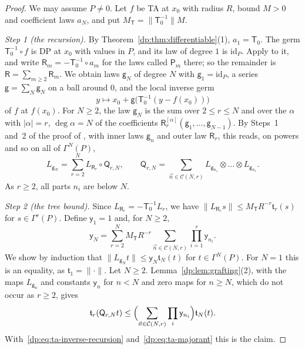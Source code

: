 \documentclass[11pt]{amsart}
\theoremstyle{definition}
\theoremstyle{remark}
\numberwithin{equation}{section}
\newcommand{\id}{\mathrm{id}}
\newcommand{\abs}[1]{\lvert #1\rvert}
\newcommand{\norm}[1]{\lVert #1\rVert}
\theoremstyle{plain}
\theoremstyle{definition}
\theoremstyle{plain}
\begin{document}
\begin{proof}
We may assume $P\ne0$. Let $f$ be TA at $x_0$ with radius $R$, bound $M>0$ and coefficient laws $a_N$, and put $M_{\mathsf T}=\norm{\mathsf T_0^{-1}}M$.

\emph{Step 1 (the recursion).} By Theorem~\ref{dp:thm:differentiable}(1), $a_1=\mathsf T_0$. The germ $\mathsf T_0^{-1}\circ f$ is DP at $x_0$ with values in $P$, and its law of degree $1$ is $\id_P$. Apply \cite[Lemma~Q.14]{I} to it, and write $\mathsf R_m=-\mathsf T_0^{-1}\circ a_m$ for the laws called $\mathsf P_m$ there; so the remainder is $\mathsf R=\sum_{m\ge2}\mathsf R_m$. We obtain laws $\mathsf g_N$ of degree $N$ with $\mathsf g_1=\id_P$, a series $\mathsf g=\sum_N\mathsf g_N$ on a ball around $0$, and the local inverse germ
\begin{equation}\label{dp:eq:ta-inverse-germ}
 y\longmapsto x_0+\mathsf g\bigl(\mathsf T_0^{-1}(y-f(x_0))\bigr)
\end{equation}
of $f$ at $f(x_0)$. For $N\ge2$, the law $\mathsf g_N$ is the sum over $2\le r\le N$ and over the $\alpha$ with $\abs\alpha=r$, $\deg\alpha=N$ of the coefficients $\mathsf R_r^{[\alpha]}(\mathsf g_1,\dots,\mathsf g_{N-1})$. By Steps~1 and~2 of the proof of \cite[Lemma~Q.4]{I}, with inner laws $\mathsf g_n$ and outer law $\mathsf R_r$, this reads, on powers and so on all of $\Gamma^N(P)$,
\begin{equation}\label{dp:eq:ta-inverse-recursion}
 L_{\mathsf g_N}=\sum_{r=2}^NL_{\mathsf R_r}\circ\mathsf Q_{r,N},\qquad
 \mathsf Q_{r,N}=\sum_{\vec n\in\mathcal C(N,r)}L_{\mathsf g_{n_1}}\otimes\dots\otimes L_{\mathsf g_{n_r}}.
\end{equation}
As $r\ge2$, all parts $n_i$ are below $N$.

\emph{Step 2 (the tree bound).} Since $L_{\mathsf R_r}=-\mathsf T_0^{-1}L_r$, we have $\norm{L_{\mathsf R_r}s}\le M_{\mathsf T}R^{-r}\mathfrak t_r(s)$ for $s\in\Gamma^r(P)$. Define $\mathsf y_1=1$ and, for $N\ge2$,
\begin{equation}\label{dp:eq:ta-majorant}
 \mathsf y_N=\sum_{r=2}^NM_{\mathsf T}R^{-r}\sum_{\vec n\in\mathcal C(N,r)}\prod_{i=1}^r\mathsf y_{n_i}.
\end{equation}
We show by induction that $\norm{L_{\mathsf g_N}t}\le\mathsf y_N\mathfrak t_N(t)$ for $t\in\Gamma^N(P)$. For $N=1$ this is an equality, as $\mathfrak t_1=\norm\cdot$. Let $N\ge2$. Lemma~\ref{dp:lem:grafting}(2), with the maps $L_{\mathsf g_n}$ and constants $\mathsf y_n$ for $n<N$ and zero maps for $n\ge N$, which do not occur as $r\ge2$, gives
\[
 \mathfrak t_r(\mathsf Q_{r,N}t)\le\Bigl(\sum_{\vec n\in\mathcal C(N,r)}\prod_i\mathsf y_{n_i}\Bigr)\mathfrak t_N(t).
\]
With~\eqref{dp:eq:ta-inverse-recursion} and~\eqref{dp:eq:ta-majorant} this is the claim.


\end{proof}
\end{document}
